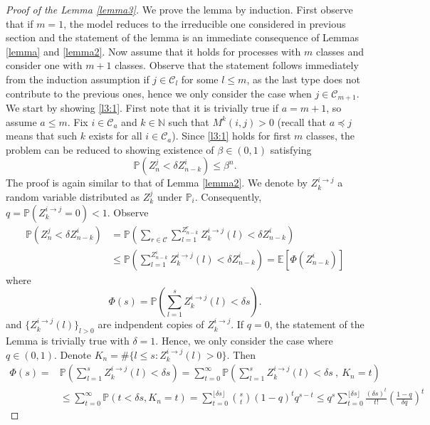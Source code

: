 \documentclass[12pt]{article}
\numberwithin{equation}{section}
\begin{document}
\begin{proof}[Proof of the Lemma \ref{lemma3}]
    We prove the lemma by induction. First observe that if $m=1$, the model reduces to the irreducible one considered in previous section and the statement of the lemma is an immediate consequence of Lemmas \ref{lemma} and \ref{lemma2}. Now assume that it holds for processes with $m$ classes and consider one with $m+1$ classes.
    Observe that the statement follows immediately from the induction assumption if $j \in \mathcal{C}_l$ for some $l\leq m$, as the last type does not contribute to the previous ones, hence we only consider the case when $j \in \mathcal{C}_{m+1}$. We start by showing \eqref{l3:1}. First note that it is trivially true if $a = m+1$, so assume $a \leq m$. Fix $i \in \mathcal{C}_a$ and $k \in \mathbb{N}$ such that $M^k(i,j) > 0$ (recall that $a \preceq j$ means that such $k$ exists for all $i \in \mathcal{C}_a$). Since \eqref{l3:1} holds for first $m$ classes, the problem can be reduced to showing existence of $\beta \in (0,1)$ satisfying
    \begin{equation}\label{l3:eq1}
       \mathbb{P}\left(Z^j_n < \delta  Z^i_{n-k}\right) \leq \beta^n.
    \end{equation}
   The proof is again similar to that of Lemma \ref{lemma2}. We denote by $Z_k^{i \rightarrow j}$ a random variable distributed as $Z_k^j$ under $\mathbb{P}_i$. Consequently, $q = \mathbb{P} \left( Z_k^{i \rightarrow j} = 0 \right) < 1$. Observe
    \begin{align*}
            \mathbb{P}\left(Z^j_n < \delta  Z^i_{n-k} \right) &= \mathbb{P} \left( \sum_{r \in \mathcal{C}} \sum_{l = 1}^{Z^r_{n-k}} Z_k^{i \rightarrow j} (l)< \delta  Z^i_{n-k} \right) \\&\leq  \mathbb{P} \left(  \sum_{l = 1}^{Z^i_{n-k}} Z_k^{i \rightarrow j} (l)< \delta  Z^i_{n-k} \right) = \mathbb{E} \left[\Phi\left(Z_{n-k}^i\right)\right]
    \end{align*}
where 
\[
\Phi(s) =  \mathbb{P} \left(  \sum_{l = 1}^{s} Z_k^{i \rightarrow j}(l) < \delta  s \right).
\]
and $\{Z_k^{i \rightarrow j} (l)\}_{l >0} $ are indpendent copies of $Z_k^{i \rightarrow j}$. 
If $q = 0$, the statement of the Lemma is trivially true with $\delta = 1$. Hence, we only consider the case where $q \in (0,1)$. Denote $K_n = \#\{l \leq s: Z_k^{i \rightarrow j}(l) > 0\}$. Then 
 \begin{align*}
     \Phi(s) = &\mathbb{P}\left(\sum_{l=1}^{s} Z_k^{i \rightarrow j}(l) < \delta s \right) = \sum_{t=0}^\infty \mathbb{P}\left(\sum_{l=1}^{s} Z_k^{i \rightarrow j}(l) < \delta s \ , \ K_n =t\right) \\&\leq \sum_{t=0}^\infty \mathbb{P}(t <\delta s,K_n=t) = \sum_{t=0}^{\lfloor \delta s \rfloor} \binom{s}{t} (1- q)^t q^{s-t} \leq q^s\sum_{t=0}^{\lfloor \delta s \rfloor}\frac {(\delta s)^t} {t!} \left(\frac {1-q} {\delta q}\right)^t

\end{align*}
\end{proof}
\end{document}
